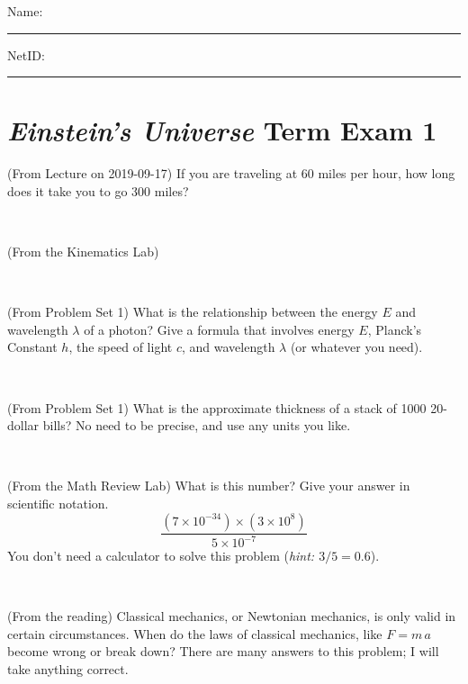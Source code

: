 \documentclass[12pt, letterpaper]{article}
\begin{document}
\noindent
Name: \rule[-1ex]{0.60\textwidth}{0.1pt}
NetID: \rule[-1ex]{0.20\textwidth}{0.1pt}

\section*{\textsl{Einstein's Universe} Term Exam 1}
\setcounter{problem}{1}


\begin{problem} (From Lecture on 2019-09-17)
If you are traveling at 60 miles per hour, how long does
it take you to go 300 miles?
\end{problem}


\vfill ~

\begin{problem} (From the Kinematics Lab)

\end{problem}


\vfill ~

\begin{problem} (From Problem Set 1)
What is the relationship between the energy $E$ and wavelength
$\lambda$ of a photon? Give a formula that involves energy $E$,
Planck's Constant $h$, the speed of light $c$, and wavelength
$\lambda$ (or whatever you need).
\end{problem}

\vfill ~

\begin{problem} (From Problem Set 1)
What is the approximate thickness of a stack of 1000 20-dollar bills?
No need to be precise, and use any units you like.
\end{problem}


\vfill ~


\clearpage


\begin{problem} (From the Math Review Lab)
What is this number? Give your answer in scientific notation.
$$
\frac{(7\times10^{-34})\times(3\times10^8)}{5\times10^{-7}}
$$
You don't need a calculator to solve this problem (\textit{hint: $3/5=0.6$}).
\end{problem}


\vfill ~

\begin{problem} (From the reading)
Classical mechanics, or Newtonian mechanics, is only valid in certain
circumstances. When do the laws of classical mechanics, like $F =
m\,a$ become wrong or break down? There are many answers to this
problem; I will take anything correct.
\end{problem}
\end{document}
